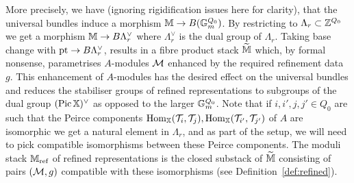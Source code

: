 \documentclass[12pt]{amsart}
\begin{document}
More precisely, we have (ignoring rigidification issues here for clarity), that the universal bundles induce a morphism $\mathbb{M} \to B(\mathbb{G}_m^{Q_0})$. By restricting to $\Lambda_r \subset \mathbb{Z}^{Q_0}$ we get a morphism $\mathbb{M} \to B\Lambda_r^{\vee}$ where $\Lambda_r^{\vee}$ is the dual group of $\Lambda_r$. 
Taking base change with $\textup{pt} \to B\Lambda_r^{\vee}$, results in a fibre product stack $\widetilde{\mathbb{M}}$ which, by formal nonsense, parametrises $A$-modules $\mathcal{M}$ enhanced by the required refinement data $g$.
This enhancement of $A$-modules has the desired effect on the universal bundles and reduces the stabiliser groups of refined representations to subgroups of the dual group $(\operatorname{Pic} \mathbb{X})^\vee$ as opposed to the larger $\mathbb{G}_m^{Q_0}$. Note that if $i,i',j,j' \in Q_0$ are such that the Peirce components $\operatorname{Hom}_{\mathbb{X}}(\mathcal{T}_i,\mathcal{T}_j), \operatorname{Hom}_{\mathbb{X}}(\mathcal{T}_{i'},\mathcal{T}_{j'})$ of $A$ are isomorphic we get a natural element in $\Lambda_r$, and as part of the setup, we will need to pick compatible isomorphisms between these Peirce components. The moduli stack $\mathbb{M}_{\textup{ref}}$ of refined representations is the closed substack of $\widetilde{\mathbb{M}}$ consisting of pairs $(\mathcal{M},g)$ compatible with these isomorphisms (see Definition~\ref{def:refined}).
\end{document}

